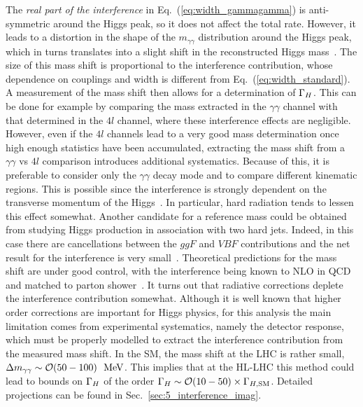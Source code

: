 The \emph{real part of the interference} in
Eq.~(\ref{eq:width_gammagamma}) is anti-symmetric around the Higgs peak,
so it does not affect the total rate. However, it leads to a
distortion in the shape of the $m_{\gamma\gamma}$ distribution around
the Higgs peak, which in turns translates into a slight shift in the
reconstructed Higgs mass~\cite{Martin:2012xc}.  The size of this mass
shift is proportional to the interference contribution, whose
dependence on couplings and width is different from
Eq.~(\ref{eq:width_standard}). A measurement of the mass shift then
allows for a determination of ${\Gamma_H}$. This can be done for example by
comparing the mass extracted in the $\gamma\gamma$ channel with that
determined in the $4l$ channel, where these interference effects are negligible. However,
even if the $4l$ channels lead to a very good mass determination
once high enough statistics  have been accumulated, extracting the
mass shift from a $\gamma\gamma$ vs $4l$ comparison introduces
additional systematics. Because of this, it is preferable to
consider only the  $\gamma\gamma$ decay mode and to compare different kinematic regions.
This is possible since the interference
is strongly dependent on the transverse momentum of the Higgs~\cite{Dixon:2013haa}. 
In particular, hard radiation tends to lessen this effect somewhat.
Another candidate for a reference mass could be obtained from studying Higgs production
in association with two hard jets. Indeed, in this case there are
cancellations between the $ggF$ and $VBF$ contributions and the net result
for the interference is very small~\cite{Coradeschi:2015tna}. Theoretical predictions for
the mass shift are under good control, with the interference being
known to NLO in QCD~\cite{Dixon:2013haa,deFlorian:2013psa,Martin:2013ula} 
and matched to parton shower~\cite{Gleisberg:2008ta,Hoche:2015sya}. It turns
out that radiative corrections deplete the interference contribution somewhat.
Although it is well known that higher order corrections are important for 
Higgs physics, for this analysis the main limitation comes from experimental
systematics, namely the detector response, which must be properly modelled
to   extract the interference contribution from the measured mass shift. 
In the SM, the mass shift at the LHC is rather small, 
$\Delta m_{\gamma\gamma}\sim\mathcal O(50-100)~{\rm ~\text{MeV}}$. This implies that
at the HL-LHC this method could lead to bounds on ${\Gamma_H}$ of the order 
${\Gamma_H} \sim \mathcal O(10-50)\times {\Gamma_{H,{\rm SM}}}$. Detailed projections can be found in Sec.~\ref{sec:5_interference_imag}.

